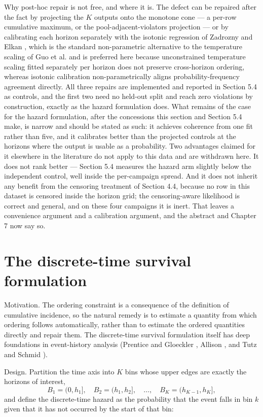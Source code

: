 Why post-hoc repair is not free, and where it is. The defect can be repaired after the fact by projecting the $K$ outputs onto the monotone cone --- a per-row cumulative maximum, or the pool-adjacent-violators projection --- or by calibrating each horizon separately with the isotonic regression of Zadrozny and Elkan \cite{ref34}, which is the standard non-parametric alternative to the temperature scaling of Guo et al. \cite{ref33} and is preferred here because unconstrained temperature scaling fitted separately per horizon does not preserve cross-horizon ordering, whereas isotonic calibration non-parametrically aligns probability-frequency agreement directly. All three repairs are implemented and reported in Section 5.4 as controls, and the first two need no held-out split and reach zero violations by construction, exactly as the hazard formulation does. What remains of the case for the hazard formulation, after the concessions this section and Section 5.4 make, is narrow and should be stated as such: it achieves coherence from one fit rather than five, and it calibrates better than the projected controls at the horizons where the output is usable as a probability. Two advantages claimed for it elsewhere in the literature do not apply to this data and are withdrawn here. It does not rank better --- Section 5.4 measures the hazard arm slightly below the independent control, well inside the per-campaign spread. And it does not inherit any benefit from the censoring treatment of Section 4.4, because no row in this dataset is censored inside the horizon grid; the censoring-aware likelihood is correct and general, and on these four campaigns it is inert. That leaves a convenience argument and a calibration argument, and the abstract and Chapter 7 now say so.


\section{The discrete-time survival formulation}
\label{sec:4_3}

Motivation. The ordering constraint is a consequence of the definition of cumulative incidence, so the natural remedy is to estimate a quantity from which ordering follows automatically, rather than to estimate the ordered quantities directly and repair them. The discrete-time survival formulation itself has deep foundations in event-history analysis (Prentice and Gloeckler \cite{ref48}, Allison \cite{ref49}, and Tutz and Schmid \cite{ref50}).

Design. Partition the time axis into $K$ bins whose upper edges are exactly the horizons of interest,
\[ B_1 = (0, h_1], \quad B_2 = (h_1, h_2], \quad \dots, \quad B_K = (h_{K-1}, h_K], \]
and define the discrete-time hazard as the probability that the event falls in bin $k$ given that it has not occurred by the start of that bin:


